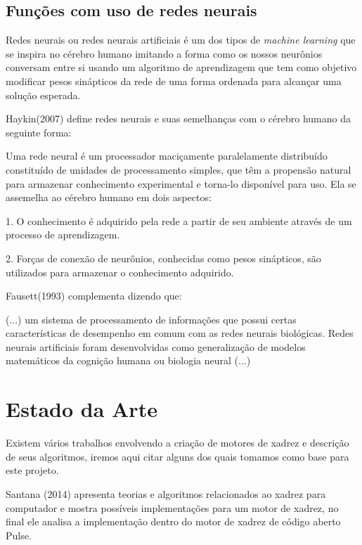\subsection{Funções com uso de redes neurais}

Redes neurais ou redes neurais artificiais é um dos tipos de \textit{machine learning} que se inspira no cérebro
humano imitando a forma como os nossos neurônios conversam entre si usando um algoritmo de aprendizagem
que tem como objetivo modificar pesos sinápticos da rede de uma forma ordenada para alcançar uma solução esperada.

Haykin(2007) define redes neurais e suas semelhanças com o cérebro humano da seguinte forma:
\begin{citacao}
    Uma rede neural é um processador maciçamente paralelamente distribuído constituído de unidades de processamento simples,
    que têm a propensão natural para armazenar conhecimento experimental e torna-lo disponível para uso. Ela se assemelha ao cérebro humano
    em dois aspectos:

    1. O conhecimento é adquirido pela rede a partir de seu ambiente através de um processo de aprendizagem.

    2. Forças de conexão de neurônios, conhecidas como pesos sinápticos, são utilizados para armazenar o conhecimento adquirido.
    \cite[p.28, tradução por Paulo Martins Engel]{HAYKIN}
\end{citacao}

Fausett(1993) complementa dizendo que:
\begin{citacao}
    (...) um sistema de processamento de informações que possui certas características de desempenho em comum com as redes
    neurais biológicas. Redes neurais artificiais foram desenvolvidas como generalização de modelos matemáticos da cognição
    humana ou biologia neural (...) \cite[p.3, tradução nossa.]{FAUSETT}
\end{citacao}

\section{Estado da Arte}

Existem vários trabalhos envolvendo a criação de motores de xadrez e descrição de seus algoritmos, iremos aqui citar
alguns dos quais tomamos como base para este projeto.

Santana (2014) apresenta teorias e algoritmos relacionados ao xadrez para computador e mostra possíveis implementações
para um motor de xadrez, no final ele analisa a implementação dentro do motor de xadrez de código aberto Pulse.

